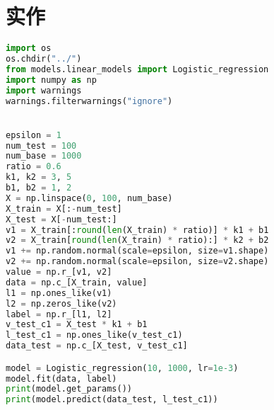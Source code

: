 \documentclass{report}
\begin{document}
\section{实作}
\begin{lstlisting}[language={python}]
import os
os.chdir("../")
from models.linear_models import Logistic_regression
import numpy as np
import warnings
warnings.filterwarnings("ignore")


epsilon = 1
num_test = 100
num_base = 1000
ratio = 0.6
k1, k2 = 3, 5
b1, b2 = 1, 2
X = np.linspace(0, 100, num_base)
X_train = X[:-num_test]
X_test = X[-num_test:]
v1 = X_train[:round(len(X_train) * ratio)] * k1 + b1
v2 = X_train[round(len(X_train) * ratio):] * k2 + b2
v1 += np.random.normal(scale=epsilon, size=v1.shape)
v2 += np.random.normal(scale=epsilon, size=v2.shape)
value = np.r_[v1, v2]
data = np.c_[X_train, value]
l1 = np.ones_like(v1)
l2 = np.zeros_like(v2)
label = np.r_[l1, l2]
v_test_c1 = X_test * k1 + b1
l_test_c1 = np.ones_like(v_test_c1)
data_test = np.c_[X_test, v_test_c1]

model = Logistic_regression(10, 1000, lr=1e-3)
model.fit(data, label)
print(model.get_params())
print(model.predict(data_test, l_test_c1))
\end{lstlisting}
\end{document}
